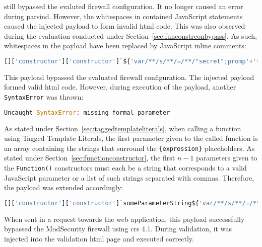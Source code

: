 still bypassed the evaluted firewall configuration. It no longer caused an error during parsind. However, the whitespaces in contained JavaScript statements caused the injected payload to form invalid \acrshort{html} code. This was also observed during the evaluation conducted under Section~\ref{sec:funconstrconbypass}. As such, whitespaces in the payload have been replaced by JavaScript inline comments:

\begin{lstlisting}[style=basicStyle, language=Python]
[]['constructor']['constructor']`${'var/**/s/**/=/**/"secret";promp'+'t`s\\u{0024}{s}`'}```
\end{lstlisting}

This payload bypassed the evaluated firewall configuration. The injected payload formed valid \acrshort{html} code. However, during execution of the payload, another \verb|SyntaxError| was thrown:

\begin{lstlisting}[style=basicStyle, language=Python]
Uncaught SyntaxError: missing formal parameter
\end{lstlisting}

As stated under Section~\ref{sec:taggedtemplateliterals}, when calling a function using Tagged Template Literals, the first parameter given to the called function is an array containing the strings that surround the \verb|{expression}| placeholders. As stated under Section~\ref{sec:functionconstructor}, the first $n-1$ parameters given to the \verb|Function()| constructors must each be a string that corresponds to a valid JavaScript parameter or a list of such strings separated with commas. 
Therefore, the payload was extended accordingly:

\begin{lstlisting}[style=basicStyle, language=Python, caption={Avoiding () bypass}, label={lst:avoiding () bypass}]
[]['constructor']['constructor']`someParameterString${'var/**/s/**/=/**/"secret";promp'+'t`s\\u{0024}{s}`'}```
\end{lstlisting}

When sent in a request towards the web application, this payload successfully bypassed the ModSecurity firewall using \acrshort{crs} 4.1. During validation, it was injected into the validation \acrshort{html} page and executed correctly. 


